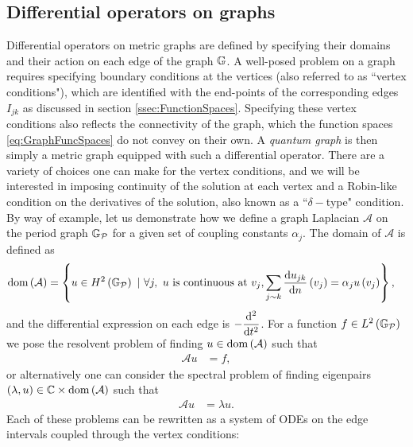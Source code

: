 \subsection{Differential operators on graphs} \label{ssec:DiffOpsOnGraphs}
Differential operators on metric graphs are defined by specifying their domains and their action on each edge of the graph $\mathbb{G}$.
A well-posed problem on a graph requires specifying boundary conditions at the vertices (also referred to as ``vertex conditions"), which are identified with the end-points of the corresponding edges $I_{jk}$ as discussed in section \ref{ssec:FunctionSpaces}.
Specifying these vertex conditions also reflects the connectivity of the graph, which the function spaces \eqref{eq:GraphFuncSpaces} do not convey on their own.
A \emph{quantum graph} is then simply a metric graph equipped with such a differential operator.
There are a variety of choices one can make for the vertex conditions, and we will be interested in imposing continuity of the solution at each vertex and a Robin-like condition on the derivatives of the solution, also known as a ``$\delta-$type" condition. 
By way of example, let us demonstrate how we define a graph Laplacian $\mathcal{A}$ on the period graph $\mathbb{G}_{\mathcal{P}}$ for a given set of coupling constants $\alpha_j$.
The domain of $\mathcal{A}$ is defined as
\begin{align} \label{eq:GraphLaplacianExample}
	\mathrm{dom}\left( \mathcal{A} \right) &= \left\{  u\in H^2\left( \mathbb{G}_{\mathcal{P}} \right) \ \vert \ \forall j, \ u \text{ is continuous at } v_j, \sum_{j\sim k}\dfrac{\mathrm{d}u_{jk}}{\mathrm{d}n}\left( v_j \right) = \alpha_j u\left( v_j \right)  \right\},
\end{align}
and the differential expression on each edge is $-\dfrac{\mathrm{d}^2 }{\mathrm{d} {t}^2}$.
For a function $f\in L^2\left( \mathbb{G}_{\mathcal{P}} \right)$ we pose the resolvent problem of finding $u\in\mathrm{dom}\left( \mathcal{A} \right)$ such that
\begin{align*}
	\mathcal{A}u &= f,
\end{align*}
or alternatively one can consider the spectral problem of finding eigenpairs $\left( \lambda,u \right)\in\mathbb{C}\times\mathrm{dom}\left( \mathcal{A} \right)$ such that
\begin{align*}
	\mathcal{A}u &= \lambda u.
\end{align*}
Each of these problems can be rewritten as a system of ODEs on the edge intervals coupled through the vertex conditions:
